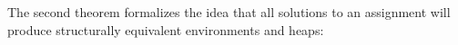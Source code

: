 
The second theorem formalizes the idea that all solutions to an
assignment will produce structurally equivalent environments and heaps:

